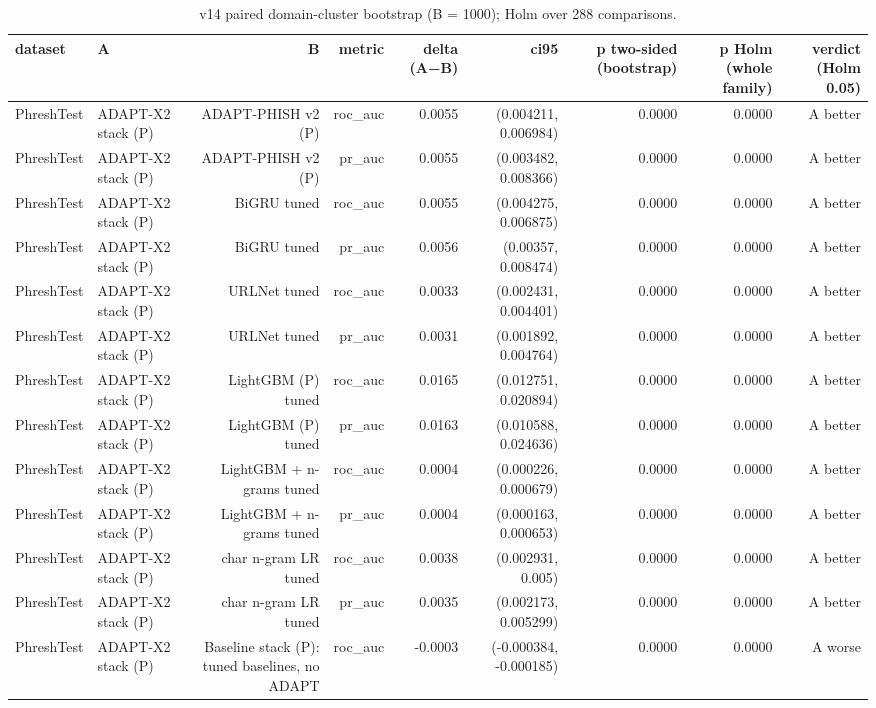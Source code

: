 \begin{table}[t]
\centering
\scriptsize
\caption{v14 paired domain-cluster bootstrap (B = 1000); Holm over 288 comparisons.}
\label{tab:rev_R15_v14_paired_tests}
\begin{tabular}{llrrrrrrr}
\toprule
dataset & A & B & metric & delta (A−B) & ci95 & p two-sided (bootstrap) & p Holm (whole family) & verdict (Holm 0.05) \\
\midrule
PhreshTest & ADAPT-X2 stack (P) & ADAPT-PHISH v2 (P) & roc\_auc & 0.0055 & (0.004211, 0.006984) & 0.0000 & 0.0000 & A better \\
PhreshTest & ADAPT-X2 stack (P) & ADAPT-PHISH v2 (P) & pr\_auc & 0.0055 & (0.003482, 0.008366) & 0.0000 & 0.0000 & A better \\
PhreshTest & ADAPT-X2 stack (P) & BiGRU tuned & roc\_auc & 0.0055 & (0.004275, 0.006875) & 0.0000 & 0.0000 & A better \\
PhreshTest & ADAPT-X2 stack (P) & BiGRU tuned & pr\_auc & 0.0056 & (0.00357, 0.008474) & 0.0000 & 0.0000 & A better \\
PhreshTest & ADAPT-X2 stack (P) & URLNet tuned & roc\_auc & 0.0033 & (0.002431, 0.004401) & 0.0000 & 0.0000 & A better \\
PhreshTest & ADAPT-X2 stack (P) & URLNet tuned & pr\_auc & 0.0031 & (0.001892, 0.004764) & 0.0000 & 0.0000 & A better \\
PhreshTest & ADAPT-X2 stack (P) & LightGBM (P) tuned & roc\_auc & 0.0165 & (0.012751, 0.020894) & 0.0000 & 0.0000 & A better \\
PhreshTest & ADAPT-X2 stack (P) & LightGBM (P) tuned & pr\_auc & 0.0163 & (0.010588, 0.024636) & 0.0000 & 0.0000 & A better \\
PhreshTest & ADAPT-X2 stack (P) & LightGBM + n-grams tuned & roc\_auc & 0.0004 & (0.000226, 0.000679) & 0.0000 & 0.0000 & A better \\
PhreshTest & ADAPT-X2 stack (P) & LightGBM + n-grams tuned & pr\_auc & 0.0004 & (0.000163, 0.000653) & 0.0000 & 0.0000 & A better \\
PhreshTest & ADAPT-X2 stack (P) & char n-gram LR tuned & roc\_auc & 0.0038 & (0.002931, 0.005) & 0.0000 & 0.0000 & A better \\
PhreshTest & ADAPT-X2 stack (P) & char n-gram LR tuned & pr\_auc & 0.0035 & (0.002173, 0.005299) & 0.0000 & 0.0000 & A better \\
PhreshTest & ADAPT-X2 stack (P) & Baseline stack (P): tuned baselines, no ADAPT & roc\_auc & -0.0003 & (-0.000384, -0.000185) & 0.0000 & 0.0000 & A worse \\

\end{tabular}
\end{table}
